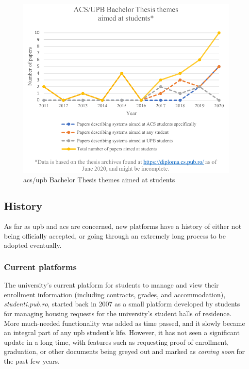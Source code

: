     \begin{figure}[ht]
        \centering
             \includegraphics[height=0.45\textheight]{figures/charts/papers_aimed_at_students.pdf}
        \caption{\acrshort{acs}/\acrshort{upb} Bachelor Thesis themes aimed at students}
        \label{2:fig:papers_aimed_at_students}
    \end{figure}
    
    \subsection{History} \label{2:existing_apps_history}
    As far as \acrshort{upb} and \acrshort{acs} are concerned, new platforms have a history of either not being officially accepted, or going through an extremely long process to be adopted eventually.
    
    \subsubsection{Current platforms} \label{2:existing_apps_history_current}
    The university's current platform for students to manage and view their enrollment information (including contracts, grades, and accommodation),  \textit{studenti.pub.ro}, started back in 2007 as a small platform developed by students for managing housing requests for the university's student halls of residence. More much-needed functionality was added as time passed, and it slowly became an integral part of any \acrshort{upb} student's life. However, it has not seen a significant update in a long time, with features such as requesting proof of enrollment, graduation, or other documents being greyed out and marked as \textit{coming soon} for the past few years.
    
